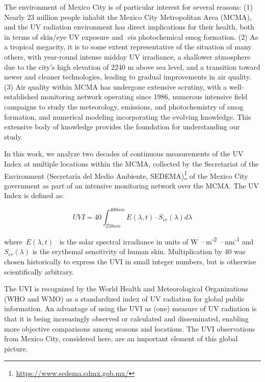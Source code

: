 \documentclass[journal=jacsat,manuscript=article]{achemso}
\begin{document}
The environment of Mexico City is of particular interest for several
reasons: (1) Nearly 23 million people inhabit the Mexico City
Metropolitan Area (MCMA), and the UV radiation environment has direct implications
for their health, both in terms of skin/eye UV exposure and~\emph{via}
photochemical smog formation. (2) As a tropical megacity, it is to some
extent representative of the situation of many others, with year-round
intense midday UV irradiance, a shallower atmosphere due to the city's
high elevation of 2240 m above sea level, and a transition toward newer
and cleaner technologies, leading to gradual improvements in air
quality. (3) Air quality within MCMA has undergone extensive scrutiny,
with a well-established monitoring network operating since
1986,\cite{RAMA}
numerous intensive field campaigns to study the
meteorology, emissions, and photochemistry of smog
formation,\citep{Doran_1998,Molina_2007,Molina_2010}
and numerical modeling incorporating the
evolving knowledge.\citep{Jazcilevich_2005,Tie_2007,Zhang_2009,Zavala_2020}
This extensive body of knowledge
provides the foundation for understanding our study.

In this work, we analyze two decades of continuous measurements of the UV Index
at multiple locations within the MCMA, collected by the Secretariat of
the Environment (Secretaría del Medio Ambiente,
SEDEMA)\footnote{\url{https://www.sedema.cdmx.gob.mx/}} of the Mexico
City government as part of an intensive monitoring network over the
MCMA. The UV Index is defined as:

\begin{equation}
  \label{eq:UVI}
  UVI=40 \int_{250nm}^{400nm} E\left(\lambda,t\right) \cdot S_{er}(\lambda) d\lambda
\end{equation}

where~\(E(\lambda,t)\)\emph{~} is the solar spectral irradiance in
units of W ·m\textsuperscript{-2} ·nm\textsuperscript{-1}
and~\(S_{er}\left(\lambda\right)\) is the erythemal sensitivity of human
skin.\citep{who2002,Webb_2011}
Multiplication by 40 was chosen historically to
express the UVI in small integer numbers, but is otherwise
scientifically arbitrary.

The UVI is recognized by the World Health and Meteorological
Organizations (WHO and WMO) as a standardized index of UV
radiation\cite{who2002} for global public information. An advantage
of using the UVI as (one) measure of UV radiation is that it is being
increasingly observed or calculated and disseminated, enabling more
objective comparisons among seasons and locations. The UVI observations
from Mexico City, considered here, are an important element of this
global picture.
\end{document}
